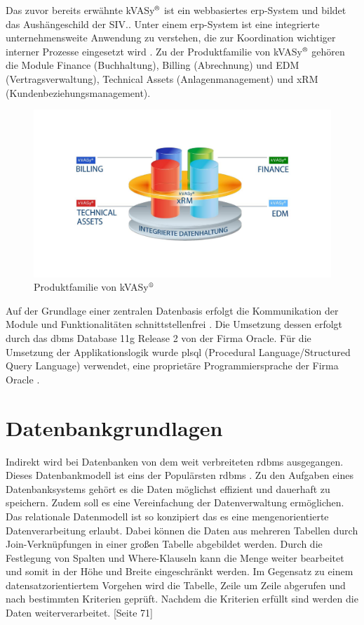 Das zuvor bereits erwähnte kVASy$^\text{\textregistered}$ ist ein webbasiertes \acrshort{erp}-System und bildet das Aushängeschild der SIV.\@AG. Unter einem \acrshort{erp}-System ist eine integrierte unternehmensweite Anwendung zu verstehen, die zur Koordination wichtiger interner Prozesse eingesetzt wird \cite[Seite 482]{kjd2010}. Zu der Produktfamilie von kVASy$^\text{\textregistered}$ gehören die Module Finance (Buchhaltung), Billing (Abrechnung) und EDM (Vertragsverwaltung), Technical Assets (Anlagenmanagement) und xRM (Kundenbeziehungsmanagement).
\begin{figure}[ht]
	\begin{center}
		\includegraphics[scale=0.25]{bilder/kVASy_Schema.png}
		\caption{Produktfamilie von kVASy$^\text{\textregistered}$\cite{SIV16}}
		\label{pic:kVASy:end}
	\end{center}
\end{figure}
Auf der Grundlage einer zentralen Datenbasis erfolgt die Kommunikation der Module und Funktionalitäten schnittstellenfrei \cite[Seite15]{SIV13}. Die Umsetzung dessen erfolgt durch das \acrfull{dbms} Database 11g Release 2 von der Firma Oracle. Für die Umsetzung der Applikationslogik wurde \acrshort{plsql} (Procedural Language/Structured Query Language) verwendet, eine proprietäre Programmiersprache der Firma Oracle \cite{wiki:plsql}.

\section{Datenbankgrundlagen} 
Indirekt wird bei Datenbanken von dem weit verbreiteten \acrfull{rdbms} ausgegangen. Dieses Datenbankmodell ist eins der Populärsten \acrshort{rdbms} \cite{DB16}. Zu den Aufgaben eines Datenbanksystems gehört es die Daten möglichst effizient und dauerhaft zu speichern. Zudem soll es eine Vereinfachung der Datenverwaltung ermöglichen. Das relationale Datenmodell ist so konzipiert das es eine mengenorientierte Datenverarbeitung erlaubt. Dabei können die Daten aus mehreren Tabellen durch Join-Verknüpfungen in einer großen Tabelle abgebildet werden. Durch die Festlegung von Spalten und Where-Klauseln kann die Menge weiter bearbeitet und somit in der Höhe und Breite eingeschränkt werden. Im Gegensatz zu einem datensatzorientiertem Vorgehen wird die Tabelle, Zeile um Zeile abgerufen und nach bestimmten Kriterien geprüft. Nachdem die Kriterien erfüllt sind werden die Daten weiterverarbeitet. \cite{Kemper2011}[Seite 71]


